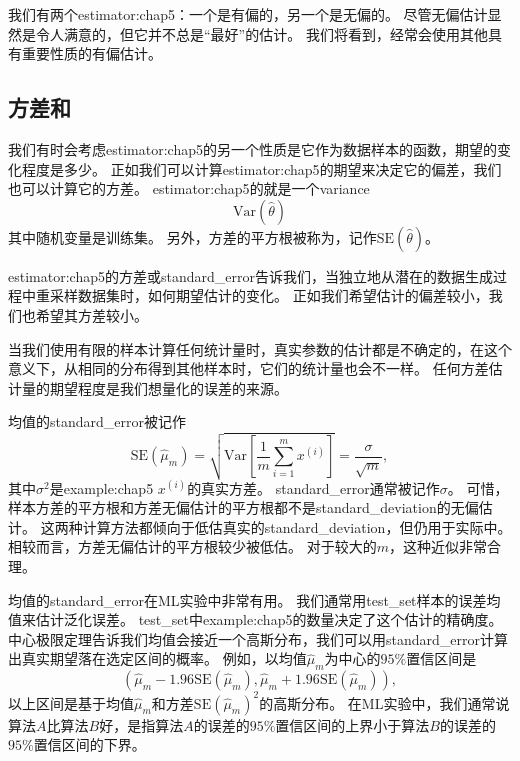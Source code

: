 
我们有两个\gls{estimator:chap5}：一个是有偏的，另一个是无偏的。
尽管无偏估计显然是令人满意的，但它并不总是``最好''的估计。
我们将看到，经常会使用其他具有重要性质的有偏估计。

\subsection{方差和}
\label{sec:variance_and_standard_error}
我们有时会考虑\gls{estimator:chap5}的另一个性质是它作为数据样本的函数，期望的变化程度是多少。
正如我们可以计算\gls{estimator:chap5}的期望来决定它的偏差，我们也可以计算它的方差。
\gls{estimator:chap5}的就是一个\gls{variance}
\begin{equation}
    \text{Var}(\hat{\theta})
\end{equation}
其中随机变量是训练集。
另外，方差的平方根被称为，记作$\text{SE}(\hat{\theta})$。

\gls{estimator:chap5}的方差或\gls{standard_error}告诉我们，当独立地从潜在的数据生成过程中重采样数据集时，如何期望估计的变化。
正如我们希望估计的偏差较小，我们也希望其方差较小。

当我们使用有限的样本计算任何统计量时，真实参数的估计都是不确定的，在这个意义下，从相同的分布得到其他样本时，它们的统计量也会不一样。
任何方差估计量的期望程度是我们想量化的误差的来源。

均值的\gls{standard_error}被记作
\begin{equation}
\label{eq:5.46}
    \text{SE}(\hat{\mu}_m) = \sqrt{ \text{Var} \left[ \frac{1}{m} \sum_{i=1}^m x^{(i)} \right] } = \frac{\sigma}{\sqrt{m}},
\end{equation}
其中$\sigma^2$是\gls{example:chap5} $x^{(i)}$的真实方差。
\gls{standard_error}通常被记作$\sigma$。
可惜，样本方差的平方根和方差无偏估计的平方根都不是\gls{standard_deviation}的无偏估计。
这两种计算方法都倾向于低估真实的\gls{standard_deviation}，但仍用于实际中。
相较而言，方差无偏估计的平方根较少被低估。
对于较大的$m$，这种近似非常合理。


均值的\gls{standard_error}在\gls{ML}实验中非常有用。
我们通常用\gls{test_set}样本的误差均值来估计泛化误差。
\gls{test_set}中\gls{example:chap5}的数量决定了这个估计的精确度。
中心极限定理告诉我们均值会接近一个高斯分布，我们可以用\gls{standard_error}计算出真实期望落在选定区间的概率。
例如，以均值$\hat{\mu}_m$为中心的$95\%$置信区间是
\begin{equation}
\label{eq:confidence_interval}
    ( \hat{\mu}_m - 1.96\text{SE}(\hat{\mu}_m), \hat{\mu}_m + 1.96 \text{SE}(\hat{\mu}_m) ),
\end{equation}
以上区间是基于均值$\hat{\mu}_m$和方差$\text{SE}(\hat{\mu}_m)^2$的高斯分布。
在\gls{ML}实验中，我们通常说算法$A$比算法$B$好，是指算法$A$的误差的$95\%$置信区间的上界小于算法$B$的误差的$95\%$置信区间的下界。


